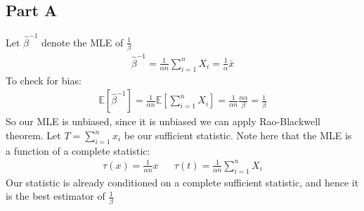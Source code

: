 \documentclass{article}
\begin{document}
\subsection*{Part A}
Let $\hat{\beta}^{-1}$ denote the MLE of $\frac{1}{\beta}$
\begin{align*}
\hat{\beta}^{-1} = \frac{1}{\alpha n} \sum_{i=1}^{n} X_i = \frac{1}{\alpha} \bar{x}
\end{align*}
To check for bias:
\begin{align*}
\mathbb{E}[\hat{\beta}^{-1}] = \frac{1}{\alpha n}\mathbb{E}[\sum_{i=1}^{n} X_i] = \frac{1}{\alpha n}  \frac{n \alpha}{\beta} = \frac{1}{\beta}
\end{align*}
So our MLE is unbiased, since it is unbiased we can apply Rao-Blackwell theorem. Let $T=\sum_{i=1}^{n}x_i$ be our sufficient statistic.
Note here that the MLE is a function of a complete statistic:
\begin{align*}
\tau(x) = \frac{1}{\alpha n} x && \boxed{ \tau(t) = \frac{1}{\alpha n} \sum_{i=1}^{n} X_i }
\end{align*}
Our statistic is already conditioned on a complete sufficient statistic, and hence it is the best estimator of $\frac{1}{\beta}$

\clearpage
\end{document}
